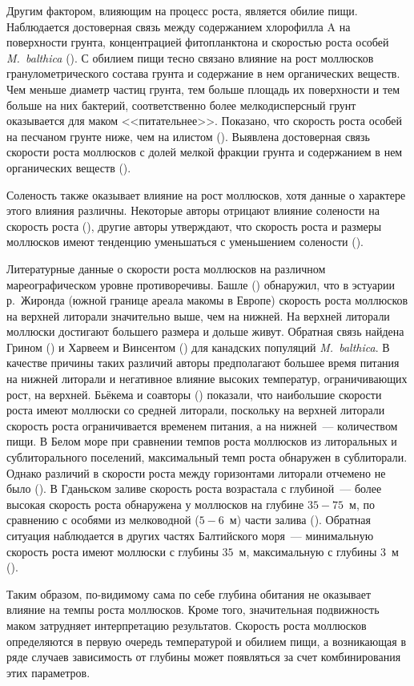 Другим фактором, влияющим на процесс роста, является обилие пищи. 
Наблюдается достоверная связь между содержанием хлорофилла A на поверхности грунта, концентрацией фитопланктона и скоростью роста особей {\it M.~balthica} (\cite{Beukema_et_al_1977, Kube_et_al_1996}). 
С обилием пищи тесно связано влияние на рост моллюсков гранулометрического состава грунта и содержание в нем органических веществ. 
Чем меньше диаметр частиц грунта, тем больше площадь их поверхности и тем больше на них бактерий, соответственно более мелкодисперсный грунт оказывается для маком <<питательнее>>. 
Показано, что скорость роста особей на песчаном грунте ниже, чем на илистом (\cite{Wenne_Klusek_1985, Maximovich_et_al_1992}). 
Выявлена достоверная связь скорости роста моллюсков с долей мелкой фракции грунта и содержанием в нем органических веществ (\cite{Kube_et_al_1996}).

Соленость также оказывает влияние на рост моллюсков, хотя данные о характере этого влияния различны. 
Некоторые авторы отрицают влияние солености на скорость роста (\cite{Bachelet_1980}), другие авторы утверждают, что скорость роста и размеры моллюсков имеют тенденцию уменьшаться с уменьшением солености (\cite{Segerstrale_1960, Kube_et_al_1996}). 

Литературные данные о скорости роста моллюсков на различном мареографическом уровне противоречивы. 
Башле (\cite{Bachelet_1980}) обнаружил, что в эстуарии р.~Жиронда (южной границе ареала макомы в Европе) скорость роста моллюсков на верхней литорали значительно выше, чем на нижней. 
На верхней литорали моллюски достигают большего размера и дольше живут. 
Обратная связь найдена Грином (\cite{Green_1973}) и Харвеем и Винсентом (\cite{Harvey_Vincent_1990}) для канадских популяций {\it M.~balthica}. 
В качестве причины  таких различий авторы предполагают большее время питания на нижней литорали и негативное влияние высоких температур, ограничивающих рост, на верхней. 
Бьёкема и соавторы (\cite{Beukema_et_al_1977}) показали, что наибольшие скорости роста имеют моллюски со средней литорали, поскольку на верхней литорали скорость роста ограничивается временем питания, а на нижней~--- количеством пищи. 
В Белом море при сравнении темпов роста моллюсков из литоральных и сублиторального поселений, максимальный темп роста обнаружен в сублиторали. 
Однако различий в скорости роста между горизонтами литорали отчемено не было (\cite{Maximovich_et_al_1992}).
В Гданьском заливе скорость роста возрастала с глубиной~--- более высокая скорость роста обнаружена у моллюсков на глубине $35 - 75$~м, по сравнению с особями из мелководной ($5 - 6$~м) части залива (\cite{Wenne_Klusek_1985}). 
Обратная ситуация наблюдается в других частях Балтийского моря~--- минимальную скорость роста имеют моллюски с глубины $35$~м, максимальную с глубины $3$~м (\cite{Segerstrale_1960}). 

Таким образом, по-видимому сама по себе глубина обитания не оказывает влияние на темпы роста моллюсков. 
Кроме того, значительная подвижность маком затрудняет интерпретацию результатов. 
Скорость роста моллюсков определяются в первую очередь температурой и обилием пищи, а возникающая в ряде случаев зависимость от глубины может появляться за счет комбинирования этих параметров.

